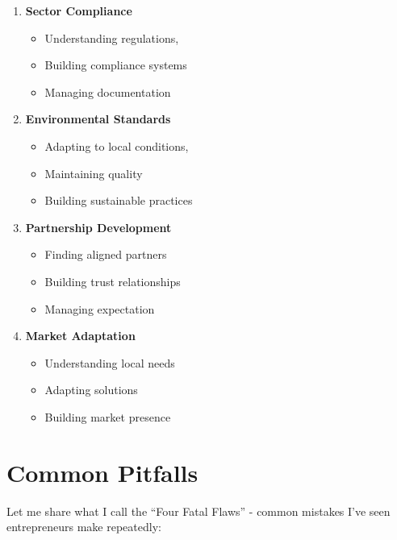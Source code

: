 \begin{enumerate}
    \item \textbf{Sector Compliance}
    \begin{itemize}
        \item Understanding regulations,
        \item Building compliance systems
        \item Managing documentation
    \end{itemize}

    \item \textbf{Environmental Standards}
    \begin{itemize}
        \item Adapting to local conditions,
        \item Maintaining quality
        \item Building sustainable practices
    \end{itemize}

    \item \textbf{Partnership Development}
    \begin{itemize}
        \item Finding aligned partners
        \item Building trust relationships
        \item Managing expectation
    \end{itemize}

    \item \textbf{Market Adaptation}
    \begin{itemize}
        \item Understanding local needs
        \item Adapting solutions
        \item Building market presence
    \end{itemize}
\end{enumerate}

\section{Common Pitfalls}\label{sec:common-pitfalls}

Let me share what I call the ``Four Fatal Flaws'' - common mistakes I've seen entrepreneurs make repeatedly:

